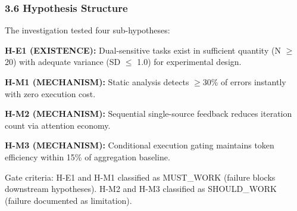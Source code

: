 \subsubsection{3.6 Hypothesis Structure}

The investigation tested four sub-hypotheses:

\textbf{H-E1 (EXISTENCE):} Dual-sensitive tasks exist in sufficient quantity (N $\geq$ 20) with adequate variance (SD $\leq$ 1.0) for experimental design.

\textbf{H-M1 (MECHANISM):} Static analysis detects $\geq 30$\% of errors instantly with zero execution cost.

\textbf{H-M2 (MECHANISM):} Sequential single-source feedback reduces iteration count via attention economy.

\textbf{H-M3 (MECHANISM):} Conditional execution gating maintains token efficiency within 15\% of aggregation baseline.

Gate criteria: H-E1 and H-M1 classified as MUST\_WORK (failure blocks downstream hypotheses). H-M2 and H-M3 classified as SHOULD\_WORK (failure documented as limitation).
